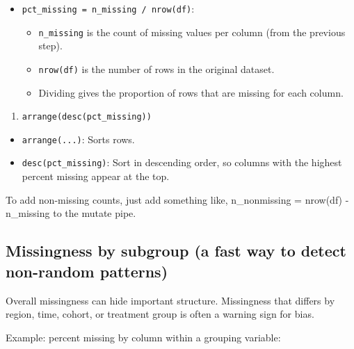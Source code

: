 \documentclass[
  11pt,
]{article}
\providecommand{\tightlist}{%
  \setlength{\itemsep}{0pt}\setlength{\parskip}{0pt}}
\begin{document}
\begin{itemize}
\tightlist
\item
  \texttt{pct\_missing\ =\ n\_missing\ /\ nrow(df)}:

  \begin{itemize}
  \tightlist
  \item
    \texttt{n\_missing} is the count of missing values per column (from
    the previous step).
  \item
    \texttt{nrow(df)} is the number of rows in the original dataset.
  \item
    Dividing gives the proportion of rows that are missing for each
    column.
  \end{itemize}
\end{itemize}

\begin{enumerate}
\def\labelenumi{\arabic{enumi}.}
\setcounter{enumi}{4}
\tightlist
\item
  \texttt{arrange(desc(pct\_missing))}
\end{enumerate}

\begin{itemize}
\tightlist
\item
  \texttt{arrange(...)}: Sorts rows.
\item
  \texttt{desc(pct\_missing)}: Sort in descending order, so columns with
  the highest percent missing appear at the top.
\end{itemize}

To add non-missing counts, just add something like, n\_nonmissing =
nrow(df) - n\_missing to the mutate pipe.

\subsection{Missingness by subgroup (a fast way to detect non-random
patterns)}\label{missingness-by-subgroup-a-fast-way-to-detect-non-random-patterns}

Overall missingness can hide important structure. Missingness that
differs by region, time, cohort, or treatment group is often a warning
sign for bias.

Example: percent missing by column within a grouping variable:
\end{document}

